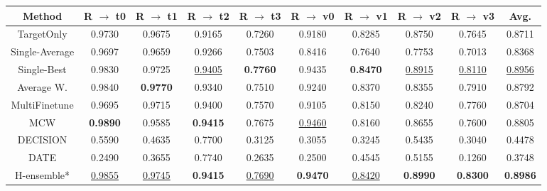 \documentclass[letterpaper]{article} %
\begin{document}
 \begin{table*}[!h]
    \renewcommand{\arraystretch}{1.2}
    \centering
    \begin{tabular}{c |c c c c| c c c c| c }
          \toprule
          Method & R $\to$ t0 & R $\to$ t1 & R $\to$ t2 & R $\to$ t3 & R $\to$ v0 & R $\to$ v1 & R $\to$ v2 & R $\to$ v3 & Avg. \\
          \midrule

TargetOnly & 0.9730 & 0.9675 & 0.9165 & 0.7260 & 0.9180 & 0.8285 & 0.8750 & 0.7645 & 0.8711 \\
          Single-Average & 0.9697 & 0.9659 & 0.9266 & 0.7503 & 0.8416 & 0.7640 & 0.7753 & 0.7013 & 0.8368 \\
          Single-Best & 0.9830 & 0.9725 & \underline{0.9405} &  \textbf{0.7760} & 0.9435 &  \textbf{0.8470} & \underline{0.8915} &  \underline{0.8110} & \underline{0.8956}\\
          \midrule
	Average W. & 0.9840 & \textbf{0.9770} & 0.9340 & 0.7510 & 0.9240 & 0.8370 & 0.8355 & 0.7910 & 0.8792 \\

    MultiFinetune  & 0.9695 & 0.9715 & 0.9400 &  0.7570 & 0.9105 &  0.8150 & 0.8240 &  0.7760 & 0.8704
 \\
           \midrule
	MCW & \textbf{0.9890} & 0.9585 & \textbf{0.9415} & 0.7675 & \underline{0.9460} & 0.8160 & 0.8655 & 0.7600 & 0.8805 \\
	DECISION & 0.5590 & 0.4635 & 0.7700 & 0.3125 & 0.3055 & 0.3245 & 0.5435 & 0.3040 & 0.4478 \\
	DATE & 0.2490 & 0.3655 & 0.7740 & 0.2635 & 0.2500 & 0.4545 & 0.5155 & 0.1260 & 0.3748 \\
          \midrule
H-ensemble* & \underline{0.9855} & \underline{0.9745} & \textbf{0.9415} & \underline{0.7690} & \textbf{0.9470} & \underline{0.8420} & \textbf{0.8990} & \textbf{0.8300} & \textbf{0.8986} \\
          \bottomrule
    \end{tabular}


\end{table*}
\end{document}
